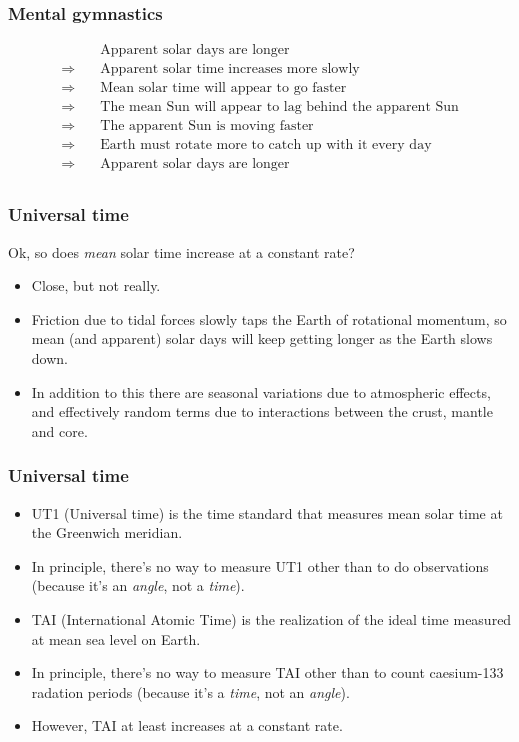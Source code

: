 \documentclass{beamer}
\begin{document}
\begin{frame}
  \frametitle{Mental gymnastics}

  \begin{align*}
    & \quad \text{Apparent solar days are longer} \\
    \Rightarrow & \quad \text{Apparent solar time increases more slowly} \\
    \Rightarrow & \quad \text{Mean solar time will appear to go faster} \\
    \Rightarrow & \quad \text{The mean Sun will appear to lag behind the apparent Sun} \\
    \Rightarrow & \quad \text{The apparent Sun is moving faster} \\
    \Rightarrow & \quad \text{Earth must rotate more to catch up with it every day} \\
    \Rightarrow & \quad \text{Apparent solar days are longer} \\
  \end{align*}
\end{frame}

\begin{frame}
  \frametitle{Universal time}

  Ok, so does \emph{mean} solar time increase at a constant rate?

  \begin{itemize}
  \item Close, but not really.
  \item Friction due to tidal forces slowly taps the Earth of rotational
    momentum, so mean (and apparent) solar days will keep getting longer as the
    Earth slows down.
  \item In addition to this there are seasonal variations due to atmospheric
    effects, and effectively random terms due to interactions between the crust,
    mantle and core.
  \end{itemize}
\end{frame}

\begin{frame}
  \frametitle{Universal time}

  \begin{itemize}
  \item UT1 (Universal time) is the time standard that measures mean solar time
    at the Greenwich meridian.
  \item In principle, there's no way to measure UT1 other than to do
    observations (because it's an \emph{angle}, not a \emph{time}).
  \item TAI (International Atomic Time) is the realization of the ideal time
    measured at mean sea level on Earth.
  \item In principle, there's no way to measure TAI other than to count
    caesium-133 radation periods (because it's a \emph{time}, not an
    \emph{angle}).
  \item However, TAI at least increases at a constant rate.
  \end{itemize}
\end{frame}
\end{document}
